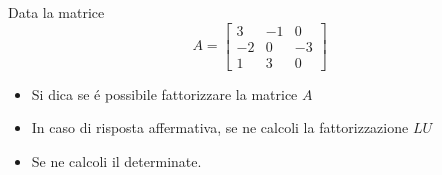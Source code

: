 Data la matrice
\bigskip
\[
A=\left[
\begin{array}{ccc}
3 & -1 & 0 \\
-2 & 0 & -3\\
1 & 3 & 0
\end{array}\right]
\]


\begin{itemize}
\item Si dica se \'e possibile fattorizzare la matrice $A$
\item In caso di risposta affermativa, se ne calcoli la fattorizzazione $LU$

\item Se ne calcoli il determinate.
\end{itemize}
